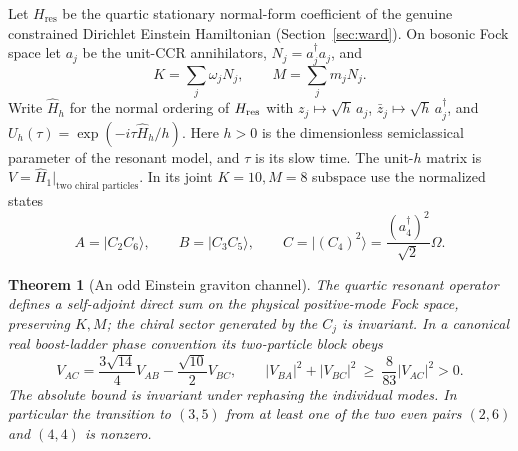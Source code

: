 \documentclass[11pt]{article}
\newtheorem{theorem}{Theorem}
\numberwithin{equation}{section}
\begin{document}
Let \(H_{\mathrm{res}}\) be the quartic stationary normal-form
coefficient of the genuine constrained Dirichlet Einstein
Hamiltonian (Section~\ref{sec:ward}). On bosonic Fock space let \(a_j\) be
the unit-CCR annihilators, \(N_j=a_j^\dagger a_j\), and
\[
 K=\sum_j\omega_jN_j,\qquad M=\sum_jm_jN_j .
\]
Write \(\widehat H_h\) for the normal ordering of \(H_{\rm res}\) with
\(z_j\mapsto\sqrt h\,a_j\), \(\bar z_j\mapsto\sqrt h\,a_j^\dagger\), and
\(U_h(\tau)=\exp(-i\tau\widehat H_h/h)\). Here \(h>0\) is the
dimensionless semiclassical parameter of the resonant model, and
\(\tau\) is its slow time. The unit-\(h\) matrix is
\(V=\widehat H_1|_{\text{two chiral particles}}\). In its joint
\(K=10,M=8\) subspace use the normalized states
\[
 A=|C_2 C_6\rangle,\qquad B=|C_3 C_5\rangle,\qquad
 C=|(C_4)^2\rangle=\frac{(a_4^\dagger)^2}{\sqrt2}\Omega .
\]
\begin{theorem}[An odd Einstein graviton channel]\label{thm:main}
The quartic resonant operator defines a self-adjoint direct sum on
the physical positive-mode Fock space, preserving \(K,M\); the chiral
sector generated by the \(C_j\) is invariant. In a canonical real
boost-ladder phase convention its two-particle block obeys
\begin{equation}\label{eq:key}
 V_{AC}=\frac{3\sqrt{14}}4 V_{AB}-\frac{\sqrt{10}}2 V_{BC},
 \qquad
 |V_{BA}|^2+|V_{BC}|^2\ \ge\ \frac{8}{83}|V_{AC}|^2>0.
\end{equation}
The absolute bound is invariant under rephasing the individual modes.
In particular the transition to \((3,5)\) from at least one of the
two even pairs \((2,6)\) and \((4,4)\) is nonzero.
\end{theorem}
\end{document}
